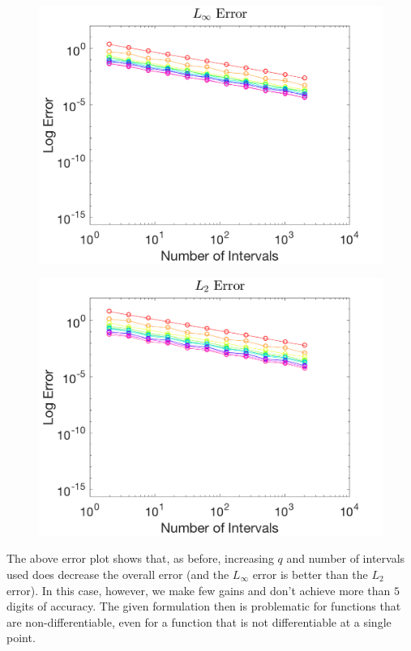 \documentclass{article}
\begin{document}
\begin{figure}[H]
  \centering
  \begin{minipage}{.6\textwidth}
    \centering
    \includegraphics[width=\linewidth]{maxError_1.png}
    \label{fig:max0}
  \end{minipage}%
  \begin{minipage}{.6\textwidth}
    \centering
    \includegraphics[width=\linewidth]{squareError_1.png}
    \label{fig:max0}
  \end{minipage}%
\end{figure}

\noindent The above error plot shows that, as before, increasing $q$ and number of intervals used does decrease the overall error (and the $L_\infty$ error is better than the $L_2$ error). In this case, however, we make few gains and don't achieve more than $5$ digits of accuracy. The given formulation then is problematic for functions that are non-differentiable, even for a function that is not differentiable at a single point.
\end{document}
